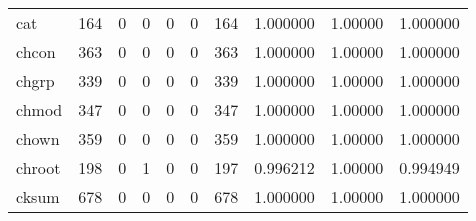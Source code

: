 \begin{tabular}{lrrrrrrrrr}
cat       &                    164 &                                  0 &                                 0 &                                0 &                                 0 &                             164 &                                1.000000 &                                1.00000 &                             1.000000 \\
chcon     &                    363 &                                  0 &                                 0 &                                0 &                                 0 &                             363 &                                1.000000 &                                1.00000 &                             1.000000 \\
chgrp     &                    339 &                                  0 &                                 0 &                                0 &                                 0 &                             339 &                                1.000000 &                                1.00000 &                             1.000000 \\
chmod     &                    347 &                                  0 &                                 0 &                                0 &                                 0 &                             347 &                                1.000000 &                                1.00000 &                             1.000000 \\
chown     &                    359 &                                  0 &                                 0 &                                0 &                                 0 &                             359 &                                1.000000 &                                1.00000 &                             1.000000 \\
chroot    &                    198 &                                  0 &                                 1 &                                0 &                                 0 &                             197 &                                0.996212 &                                1.00000 &                             0.994949 \\
cksum     &                    678 &                                  0 &                                 0 &                                0 &                                 0 &                             678 &                                1.000000 &                                1.00000 &                             1.000000 \\

\end{tabular}
